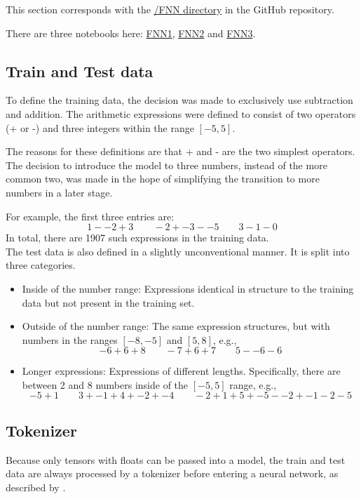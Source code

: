 \documentclass{article}
\begin{document}
This section corresponds with the \href{https://github.com/AntonStantan/matura/tree/main/FNN}{/FNN directory} in the GitHub repository.

There are three notebooks here: \href{https://github.com/AntonStantan/matura/blob/main/FNN/FNN1.ipynb}{FNN1}, \href{https://github.com/AntonStantan/matura/blob/main/FNN/FNN2.ipynb}{FNN2} and \href{https://github.com/AntonStantan/matura/blob/main/FNN/FNN3.ipynb}{FNN3}.

\subsection{Train and Test data}
To define the training data, the decision was made to exclusively use subtraction and addition. The arithmetic expressions were defined to consist of two operators (+ or -) and three integers within the range $[-5, 5]$.

The reasons for these definitions are that + and - are the two simplest operators. The decision to introduce the model to three numbers, instead of the more common two, was made in the hope of simplifying the transition to more numbers in a later stage.

For example, the first three entries are:
\[
1 - -2 + 3 \qquad -2 + -3 - -5 \qquad 3 - 1 - 0
\]
{\small In total, there are 1907 such expressions in the training data.}
\\[2em]
The test data is also defined in a slightly unconventional manner. It is split into three categories.
\begin{itemize}
    \item Inside of the number range: Expressions identical in structure to the training data but not present in the training set.
    \item Outside of the number range: The same expression structures, but with numbers in the ranges $[-8, -5]$ and $[5, 8]$, e.g.,
\[
-6 + 6 + 8 \qquad -7 + 6 + 7 \qquad 5 - -6 - 6
\]
    \item Longer expressions: Expressions of different lengths. Specifically, there are between 2 and 8 numbers inside of the $[-5, 5]$ range, e.g.,
\[
-5 + 1 \qquad 3 + -1 + 4 + -2 + -4 \qquad -2 + 1 + 5 + -5 - -2 + -1 - 2 - 5
\]
\end{itemize}

\subsection{Tokenizer}

Because only tensors with floats can be passed into a model, the train and test data are always processed by a tokenizer before entering a neural network, as described by \cite{geeksforgeeks_nlp_tokenizing}.
\end{document}
